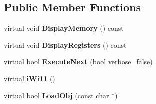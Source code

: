 \subsection*{Public Member Functions}
\begin{DoxyCompactItemize}
\item 
\hypertarget{classWi11_a0f532cefdebd3c33ddc93e8bce4dc06b}{
virtual void {\bfseries DisplayMemory} () const }
\label{classWi11_a0f532cefdebd3c33ddc93e8bce4dc06b}

\item 
\hypertarget{classWi11_a201359b2506539dda72075b908076492}{
virtual void {\bfseries DisplayRegisters} () const }
\label{classWi11_a201359b2506539dda72075b908076492}

\item 
\hypertarget{classWi11_ace44826e4f92aabd233b68bdd9437c1b}{
virtual bool {\bfseries ExecuteNext} (bool verbose=false)}
\label{classWi11_ace44826e4f92aabd233b68bdd9437c1b}

\item 
\hypertarget{classWi11_ab1df37ddc05a51bc3adabf51b50ad39e}{
virtual {\bfseries iWi11} ()}
\label{classWi11_ab1df37ddc05a51bc3adabf51b50ad39e}

\item 
\hypertarget{classWi11_a50af76350b3e72c75d42035582aeb321}{
virtual bool {\bfseries LoadObj} (const char $\ast$)}
\label{classWi11_a50af76350b3e72c75d42035582aeb321}

\end{DoxyCompactItemize}
